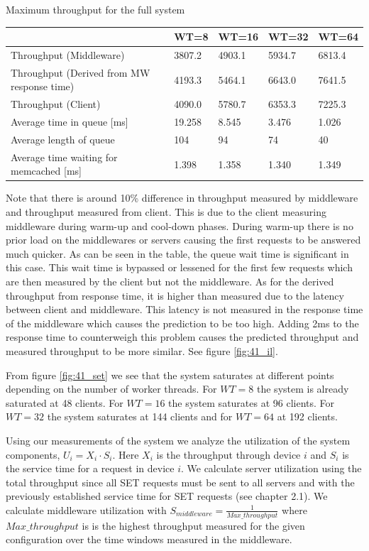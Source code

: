\documentclass[11pt,a4paper]{article}
\begin{document}
\begin{center}
	{Maximum throughput for the full system}
	\begin{tabular}{|l|p{1.5cm}|p{1.5cm}|p{1.5cm}|p{1.5cm}|}
		\hline                                            & WT=8 & WT=16 & WT=32 & WT=64 \\ 
		\hline Throughput (Middleware)                    & 3807.2 & 4903.1 & 5934.7 & 6813.4 \\ 
		\hline Throughput (Derived from MW response time) & 4193.3 & 5464.1 & 6643.0 & 7641.5 \\ 
		\hline Throughput (Client)                        & 4090.0 & 5780.7 & 6353.3 & 7225.3 \\ 
		\hline Average time in queue [ms]                 & 19.258 & 8.545   & 3.476 & 1.026    \\ 
		\hline Average length of queue                    & 104   & 94    & 74    & 40    \\ 
		\hline Average time waiting for memcached [ms]    & 1.398 & 1.358 & 1.340 & 1.349  \\ 
		\hline 
	\end{tabular}
\end{center}

Note that there is around 10\% difference in throughput measured by middleware and throughput measured from client. This is due to the client measuring middleware during warm-up and cool-down phases. During warm-up there is no prior load on the middlewares or servers causing the first requests to be answered much quicker. As can be seen in the table, the queue wait time is significant in this case. This wait time is bypassed or lessened for the first few requests which are then measured by the client but not the middleware. As for the derived throughput from response time, it is higher than measured due to the latency between client and middleware. This latency is not measured in the response time of the middleware which causes the prediction to be too high. Adding 2ms to the response time to counterweigh this problem causes the predicted throughput and measured throughput to be more similar. See figure \ref{fig:41_il}.

From figure \ref{fig:41_set} we see that the system saturates at different points depending on the number of worker threads. For $WT=8$ the system is already saturated at 48 clients. For $WT=16$ the system saturates at 96 clients. For $WT=32$ the system saturates at 144 clients and for $WT=64$ at 192 clients.

Using our measurements of the system we analyze the utilization of the system components, $U_i = X_i \cdot S_i$. Here $X_i$ is the throughput through device $i$ and $S_i$ is the service time for a request in device $i$. We calculate server utilization using the total throughput since all SET requests must be sent to all servers and with the previously established service time for SET requests (see chapter 2.1). We calculate middleware utilization with $S_{middleware} = \frac{1}{Max\_throughput}$ where $Max\_throughput$ is is the highest throughput measured for the given configuration over the time windows measured in the middleware. 
\end{document}

